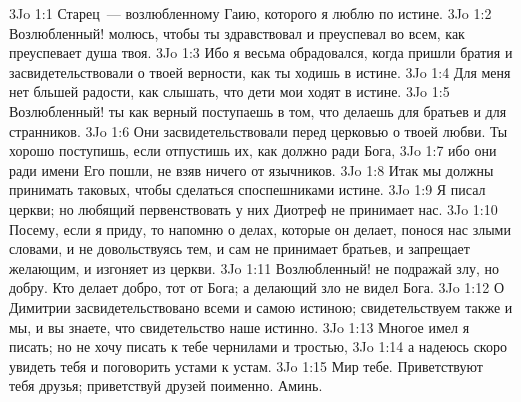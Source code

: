 \vs 3Jo 1:1 Старец~--- возлюбленному Гаию, которого я люблю по истине.
\rsbpar\vs 3Jo 1:2 Возлюбленный! молюсь, чтобы ты здравствовал и преуспевал во всем, как преуспевает душа твоя.
\vs 3Jo 1:3 Ибо я весьма обрадовался, когда пришли братия и засвидетельствовали о твоей верности, как ты ходишь в истине.
\vs 3Jo 1:4 Для меня нет бльшей радости, как слышать, что дети мои ходят в истине.
\rsbpar\vs 3Jo 1:5 Возлюбленный! ты как верный поступаешь в том, что делаешь для братьев и для странников.
\vs 3Jo 1:6 Они засвидетельствовали перед церковью о твоей любви. Ты хорошо поступишь, если отпустишь их, как должно ради Бога,
\vs 3Jo 1:7 ибо они ради имени Его пошли, не взяв ничего от язычников.
\vs 3Jo 1:8 Итак мы должны принимать таковых, чтобы сделаться споспешниками истине.
\rsbpar\vs 3Jo 1:9 Я писал церкви; но любящий первенствовать у них Диотреф не принимает нас.
\vs 3Jo 1:10 Посему, если я приду, то напомню о делах, которые он делает, понося нас злыми словами, и не довольствуясь тем, и сам не принимает братьев, и запрещает желающим, и изгоняет из церкви.
\vs 3Jo 1:11 Возлюбленный! не подражай злу, но добру. Кто делает добро, тот от Бога; а делающий зло не видел Бога.
\vs 3Jo 1:12 О Димитрии засвидетельствовано всеми и самою истиною; свидетельствуем также и мы, и вы знаете, что свидетельство наше истинно.
\rsbpar\vs 3Jo 1:13 Многое имел я писать; но не хочу писать к тебе чернилами и тростью,
\vs 3Jo 1:14 а надеюсь скоро увидеть тебя и поговорить устами к устам.
\vs 3Jo 1:15 Мир тебе. Приветствуют тебя друзья; приветствуй друзей поименно. Аминь.
